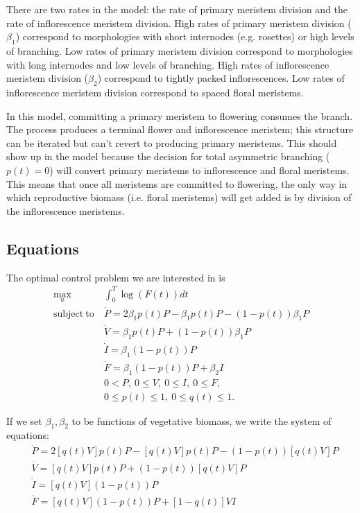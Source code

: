\documentclass[12pt, oneside,titlepage]{article}   	%
\begin{document}
There are two rates in the model: the rate of primary meristem division and the rate of inflorescence meristem division. High rates of primary meristem division ($\beta_1$) correspond to morphologies with short internodes (e.g. rosettes) or high levels of branching. Low rates of primary meristem division correspond to morphologies with long internodes and low levels of branching. High rates of inflorescence meristem division ($\beta_2$) correspond to tightly packed inflorescences. Low rates of inflorescence meristem division correspond to spaced floral meristems. 

In this model, committing a primary meristem to flowering consumes the branch. The process produces a terminal flower and inflorescence meristem; this structure can be iterated but can't revert to producing primary meristems. This should show up in the model because the decision for total asymmetric branching ($p(t)=0$) will convert primary meristems to inflorescence and floral meristems. This means that once all meristems are committed to flowering, the only way in which reproductive biomass (i.e. floral meristems) will get added is by division of the inflorescence meristems. 

\subsection{Equations}

The optimal control problem we are interested in is
%
\begin{align}
\max_{u} &  \int_0^T \log( F(t) ) dt \nonumber \\
\mathrm{subject\ to\ } 
& \dot{P}  = 2 \beta_1 p(t) P - \beta_1 p(t) P - ( 1-p(t) ) \beta_1 P \nonumber \\
& \dot{V} = \beta_1 p(t) P + ( 1-p(t) ) \beta_1 P \nonumber \\
& \dot{I}  = \beta_1 ( 1-p(t) ) P \nonumber \\ 
& \dot{F}  = \beta_1 ( 1-p(t) ) P + \beta_2 I
 \nonumber \\ 
& 0 < P,\ 0 \leq V,\ 0 \leq I,\ 0 \leq F, \nonumber\\
& 0 \leq p(t) \leq 1,\ 0 \leq q(t) \leq 1. \nonumber
\end{align}

If we set $\beta_1, \beta_2$ to be functions of vegetative biomass, we write the system of equations:
%
\begin{align}
& \dot{P}  = 2 [q(t) V] p(t) P - [q(t) V] p(t) P - ( 1-p(t) ) [q(t) V] P \nonumber \\
& \dot{V} = [q(t) V] p(t) P + ( 1-p(t) ) [q(t) V] P \nonumber \\
& \dot{I}  = [q(t) V] ( 1-p(t) ) P \nonumber \\ 
& \dot{F}  = [q(t) V] ( 1-p(t) ) P + [1-q(t)] V I
\end{align}
\end{document}
